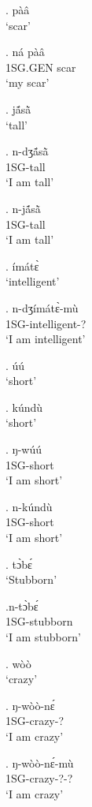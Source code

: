 \documentclass{assets/fieldnotes}
\begin{document}
\ex. pàâ\\
`scar'

\exg. ná pàâ\\
1SG.GEN scar\\
`my scar'

\ex. jã́sã̀\\
`tall'

\exg. n-dʒã́sã̀\\
1SG-tall\\
`I am tall' 

\exg. n-jã́sã̀\\
1SG-tall\\
`I am tall'

\ex. ímátɛ̀\\
`intelligent'

\exg. n-dʒímátɛ̀-mù\\
1SG-intelligent-?\\
`I am intelligent'


\ex. úú\\
`short'

\ex. kúndù\\
`short'

\exg. ŋ-wúú\\
1SG-short\\
`I am short'

\exg. n-kúndù\\
1SG-short\\
`I am short'

\ex. tɔ̀bɛ́\\
`Stubborn'

\ex.n-tɔ̀bɛ́\\
1SG-stubborn\\
`I am stubborn'

\ex. wòò\\
`crazy'

\exg. ŋ-wòò-nɛ́\\
1SG-crazy-?\\
`I am crazy'

\exg. ŋ-wòò-nɛ́-mù\\
1SG-crazy-?-?\\
`I am crazy'

\end{document}
